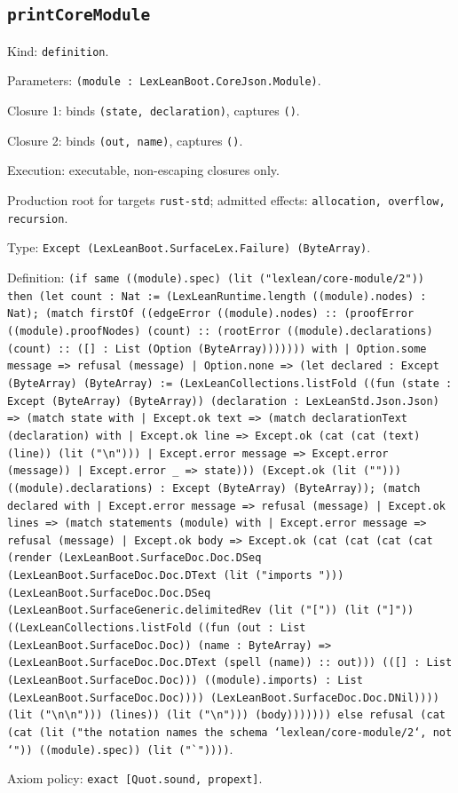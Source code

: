 \documentclass[11pt]{article}
\begin{document}
\subsection*{\texttt{printCoreModule}}
\noindent Kind: \texttt{definition}.\par
\noindent Parameters: \texttt{(module : LexLeanBoot.CoreJson.Module)}.\par
\noindent Closure 1: binds \texttt{(state, declaration)}, captures \texttt{()}.\par
\noindent Closure 2: binds \texttt{(out, name)}, captures \texttt{()}.\par
\noindent Execution: executable, non-escaping closures only.\par
\noindent Production root for targets \texttt{rust-std}; admitted effects: \texttt{allocation, overflow, recursion}.\par
\noindent Type: \texttt{Except (LexLeanBoot.SurfaceLex.Failure) (ByteArray)}.\par
\noindent Definition: \texttt{(if same ((module).spec) (lit ("lexlean/core-module/2")) then (let count : Nat := (LexLeanRuntime.length ((module).nodes) : Nat); (match firstOf ((edgeError ((module).nodes) :: (proofError ((module).proofNodes) (count) :: (rootError ((module).declarations) (count) :: ([] : List (Option (ByteArray))))))) with | Option.some message => refusal (message) | Option.none => (let declared : Except (ByteArray) (ByteArray) := (LexLeanCollections.listFold ((fun (state : Except (ByteArray) (ByteArray)) (declaration : LexLeanStd.Json.Json) => (match state with | Except.ok text => (match declarationText (declaration) with | Except.ok line => Except.ok (cat (cat (text) (line)) (lit ("\textbackslash{}n"))) | Except.error message => Except.error (message)) | Except.error \_ => state))) (Except.ok (lit (""))) ((module).declarations) : Except (ByteArray) (ByteArray)); (match declared with | Except.error message => refusal (message) | Except.ok lines => (match statements (module) with | Except.error message => refusal (message) | Except.ok body => Except.ok (cat (cat (cat (cat (render (LexLeanBoot.SurfaceDoc.Doc.DSeq (LexLeanBoot.SurfaceDoc.Doc.DText (lit ("imports "))) (LexLeanBoot.SurfaceDoc.Doc.DSeq (LexLeanBoot.SurfaceGeneric.delimitedRev (lit ("[")) (lit ("]")) ((LexLeanCollections.listFold ((fun (out : List (LexLeanBoot.SurfaceDoc.Doc)) (name : ByteArray) => (LexLeanBoot.SurfaceDoc.Doc.DText (spell (name)) :: out))) (([] : List (LexLeanBoot.SurfaceDoc.Doc))) ((module).imports) : List (LexLeanBoot.SurfaceDoc.Doc)))) (LexLeanBoot.SurfaceDoc.Doc.DNil)))) (lit ("\textbackslash{}n\textbackslash{}n"))) (lines)) (lit ("\textbackslash{}n"))) (body))))))) else refusal (cat (cat (lit ("the notation names the schema `lexlean/core-module/2`, not `")) ((module).spec)) (lit ("`"))))}.\par
\noindent Axiom policy: \texttt{exact [Quot.sound, propext]}.\par
\end{document}
